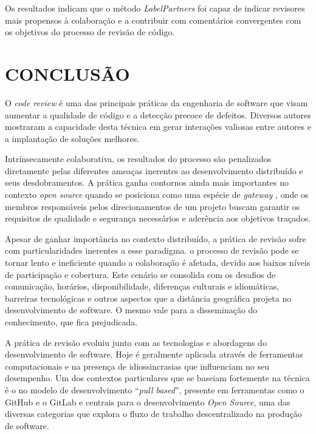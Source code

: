 \documentclass[12pt,openany,oneside,a4paper,english,brazil]{abntbibufjf}
\begin{document}
Os resultados indicam que o método \textit{LabelPartners} foi capaz de indicar revisores mais propensos à colaboração e a contribuir com comentários convergentes com os objetivos do processo de revisão de código.

\chapter{CONCLUSÃO}\label{chap:conclusao}

O \textit{code review} é uma das principais práticas da engenharia de software que visam aumentar a qualidade de código e a detecção precoce de defeitos. Diversos autores mostraram a capacidade desta técnica em gerar interações valiosas entre autores e a implantação de soluções melhores.

Intrínsecamente colaborativa, os resultados do processo são penalizados diretamente pelas diferentes ameaças inerentes ao desenvolvimento distribuído e seus desdobramentos. A prática ganha contornos ainda mais importantes no contexto \textit{open source} quando se posiciona como uma espécie de \textit{gateway} , onde os membros responsáveis pelos direcionamentos de um projeto buscam garantir os requisitos de qualidade e segurança necessários e aderência aos objetivos traçados.

Apesar de ganhar importância no contexto distribuído, a prática de revisão sofre com particularidades inerentes a esse paradigma. o  processo de revisão pode se tornar lento e ineficiente quando a colaboração é afetada, devido aos baixos níveis de participação e cobertura. Este cenário se consolida com os desafios de comunicação, horários, disponibilidade, diferenças culturais e idiomáticas, barreiras tecnológicas e outros aspectos que a distância geográfica projeta no desenvolvimento de software. O mesmo vale para a disseminação do conhecimento, que fica prejudicada.

A prática de revisão evoluiu junto com as tecnologias e abordagens do desenvolvimento de software. Hoje é geralmente aplicada através de ferramentas computacionais e na presença de idiossincrasias que influenciam no seu desempenho. Um dos contextos particulares que se baseiam fortemente na técnica é o no modelo de desenvolvimento ``\textit{pull based}'', presente em ferramentas como o GitHub e o GitLab e centrais para o desenvolvimento \textit{Open Source}, uma das diversas categorias que explora o fluxo de trabalho descentralizado na produção de software.
\end{document}

